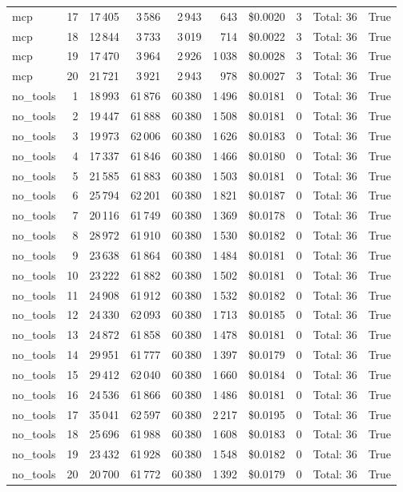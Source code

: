 \documentclass[a4paper,11pt]{article}
\begin{document}
\begin{table}[H]
{\begin{tabular}{l r r r r r r r l r}
mcp & 17 & 17\,405 & 3\,586 & 2\,943 & 643 & \$0.0020 & 3 & Total: 36 & True \\
mcp & 18 & 12\,844 & 3\,733 & 3\,019 & 714 & \$0.0022 & 3 & Total: 36 & True \\
mcp & 19 & 17\,470 & 3\,964 & 2\,926 & 1\,038 & \$0.0028 & 3 & Total: 36 & True \\
mcp & 20 & 21\,721 & 3\,921 & 2\,943 & 978 & \$0.0027 & 3 & Total: 36 & True \\
\midrule
no\_tools & 1 & 18\,993 & 61\,876 & 60\,380 & 1\,496 & \$0.0181 & 0 & Total: 36 & True \\
no\_tools & 2 & 19\,447 & 61\,888 & 60\,380 & 1\,508 & \$0.0181 & 0 & Total: 36 & True \\
no\_tools & 3 & 19\,973 & 62\,006 & 60\,380 & 1\,626 & \$0.0183 & 0 & Total: 36 & True \\
no\_tools & 4 & 17\,337 & 61\,846 & 60\,380 & 1\,466 & \$0.0180 & 0 & Total: 36 & True \\
no\_tools & 5 & 21\,585 & 61\,883 & 60\,380 & 1\,503 & \$0.0181 & 0 & Total: 36 & True \\
no\_tools & 6 & 25\,794 & 62\,201 & 60\,380 & 1\,821 & \$0.0187 & 0 & Total: 36 & True \\
no\_tools & 7 & 20\,116 & 61\,749 & 60\,380 & 1\,369 & \$0.0178 & 0 & Total: 36 & True \\
no\_tools & 8 & 28\,972 & 61\,910 & 60\,380 & 1\,530 & \$0.0182 & 0 & Total: 36 & True \\
no\_tools & 9 & 23\,638 & 61\,864 & 60\,380 & 1\,484 & \$0.0181 & 0 & Total: 36 & True \\
no\_tools & 10 & 23\,222 & 61\,882 & 60\,380 & 1\,502 & \$0.0181 & 0 & Total: 36 & True \\
no\_tools & 11 & 24\,908 & 61\,912 & 60\,380 & 1\,532 & \$0.0182 & 0 & Total: 36 & True \\
no\_tools & 12 & 24\,330 & 62\,093 & 60\,380 & 1\,713 & \$0.0185 & 0 & Total: 36 & True \\
no\_tools & 13 & 24\,872 & 61\,858 & 60\,380 & 1\,478 & \$0.0181 & 0 & Total: 36 & True \\
no\_tools & 14 & 29\,951 & 61\,777 & 60\,380 & 1\,397 & \$0.0179 & 0 & Total: 36 & True \\
no\_tools & 15 & 29\,412 & 62\,040 & 60\,380 & 1\,660 & \$0.0184 & 0 & Total: 36 & True \\
no\_tools & 16 & 24\,536 & 61\,866 & 60\,380 & 1\,486 & \$0.0181 & 0 & Total: 36 & True \\
no\_tools & 17 & 35\,041 & 62\,597 & 60\,380 & 2\,217 & \$0.0195 & 0 & Total: 36 & True \\
no\_tools & 18 & 25\,696 & 61\,988 & 60\,380 & 1\,608 & \$0.0183 & 0 & Total: 36 & True \\
no\_tools & 19 & 23\,432 & 61\,928 & 60\,380 & 1\,548 & \$0.0182 & 0 & Total: 36 & True \\
no\_tools & 20 & 20\,700 & 61\,772 & 60\,380 & 1\,392 & \$0.0179 & 0 & Total: 36 & True \\
\bottomrule
\end{tabular}}
\end{table}
\end{document}
